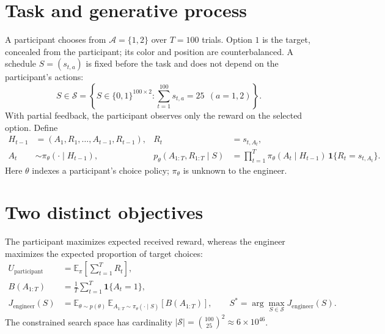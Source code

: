 \documentclass[11pt]{article}
\begin{document}

\section{Task and generative process}
A participant chooses from $\mathcal A=\{1,2\}$ over $T=100$ trials. Option $1$ is the target, concealed from the participant; its color and position are counterbalanced. A schedule $S=(s_{t,a})$ is fixed before the task and does not depend on the participant's actions:
\begin{equation}
S\in\mathcal S=\left\{S\in\{0,1\}^{100\times2}:\sum_{t=1}^{100}s_{t,a}=25\ \ (a=1,2)\right\}.
\label{eq:feasible}
\end{equation}
With partial feedback, the participant observes only the reward on the selected option. Define
\begin{align}
H_{t-1}&=(A_1,R_1,\ldots,A_{t-1},R_{t-1}), & R_t&=s_{t,A_t},\label{eq:hist}\\
A_t&\sim\pi_\theta(\cdot\mid H_{t-1}),&
 p_\theta(A_{1:T},R_{1:T}\mid S)&=\prod_{t=1}^{T}\pi_\theta(A_t\mid H_{t-1})\,\mathbf1\{R_t=s_{t,A_t}\}.\label{eq:gen}
\end{align}
Here $\theta$ indexes a participant's choice policy; $\pi_\theta$ is unknown to the engineer.

\section{Two distinct objectives}
The participant maximizes expected received reward, whereas the engineer maximizes the expected proportion of target choices:
\begin{align}
U_{\mathrm{participant}}&=\mathbb E_{\pi}\!\left[\sum_{t=1}^{T}R_t\right],\label{eq:part}\\
B(A_{1:T})&=\frac1T\sum_{t=1}^{T}\mathbf1\{A_t=1\},\label{eq:bias}\\
J_{\mathrm{engineer}}(S)&=\mathbb E_{\theta\sim p(\theta)}\,\mathbb E_{A_{1:T}\sim\pi_\theta(\cdot\mid S)}[B(A_{1:T})],\qquad S^*=\arg\max_{S\in\mathcal S}J_{\mathrm{engineer}}(S).\label{eq:obj}
\end{align}
The constrained search space has cardinality $|\mathcal S|=\binom{100}{25}^{2}\approx 6\times10^{46}$.

\clearpage
\end{document}
